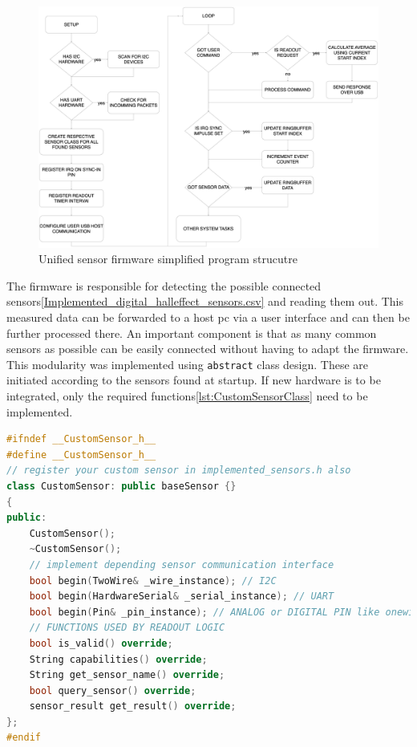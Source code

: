 \begin{figure}
\centering
\includegraphics{./generated_images/border_Unified_sensor_firmware_simplified_program_strucutre.png}
\caption{Unified sensor firmware simplified program strucutre
\label{Unified_sensor_firmware_simplified_program_strucutre.png}}
\end{figure}

The firmware is responsible for detecting the possible connected
sensors\ref{Implemented_digital_halleffect_sensors.csv} and reading them
out. This measured data can be forwarded to a host \gls{pc} via a user
interface and can then be further processed there. An important
component is that as many common sensors as possible can be easily
connected without having to adapt the firmware. This modularity was
implemented using \passthrough{\lstinline!abstract!} class design. These
are initiated according to the sensors found at startup. If new hardware
is to be integrated, only the required
functions\ref{lst:CustomSensorClass} need to be implemented.

\begin{lstlisting}[language={C++}, caption={CustomSensor-Class for adding new sensor hardware support}, label=lst:CustomSensorClass]
#ifndef __CustomSensor_h__
#define __CustomSensor_h__
// register your custom sensor in implemented_sensors.h also
class CustomSensor: public baseSensor {}
{
public:
    CustomSensor();
    ~CustomSensor();
    // implement depending sensor communication interface
    bool begin(TwoWire& _wire_instance); // I2C
    bool begin(HardwareSerial& _serial_instance); // UART
    bool begin(Pin& _pin_instance); // ANALOG or DIGITAL PIN like onewire
    // FUNCTIONS USED BY READOUT LOGIC
    bool is_valid() override;
    String capabilities() override;
    String get_sensor_name() override;
    bool query_sensor() override;
    sensor_result get_result() override;        
};
#endif
\end{lstlisting}

